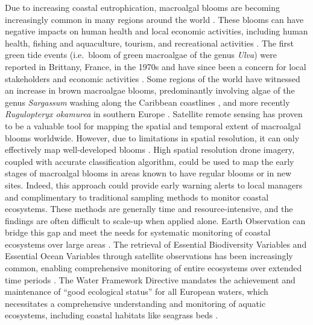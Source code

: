 \documentclass[
  number]{elsarticle}
\begin{document}
Due to increasing coastal eutrophication, macroalgal blooms are becoming
increasingly common in many regions around the world
\citep{sutton2011european, ye2011green}. These blooms can have negative
impacts on human health and local economic activities, including human
health, fishing and aquaculture, tourism, and recreational activities
\citep{villares1999nitrogen, ye2011green}. The first green tide events
(i.e.~bloom of green macroalgae of the genus \emph{Ulva}) were reported
in Brittany, France, in the 1970s and have since been a concern for
local stakeholders and economic activities \citep{menesguen2018marees}.
Some regions of the world have witnessed an increase in brown macroalgae
blooms, predominantly involving algae of the genus \emph{Sargassum}
washing along the Caribbean coastlines \citep{louime2017sargassum}, and
more recently \emph{Rugulopteryx okamurea} in southern Europe
\citep{Roca2022}. Satellite remote sensing has proven to be a valuable
tool for mapping the spatial and temporal extent of macroalgal blooms
worldwide. However, due to limitations in spatial resolution, it can
only effectively map well-developed blooms
\citep{rs13081408, klemas2012remote, haro2023biointertidal}. High
spatial resolution drone imagery, coupled with accurate classification
algorithm, could be used to map the early stages of macroalgal blooms in
areas known to have regular blooms or in new sites. Indeed, this
approach could provide early warning alerts to local managers and
complimentary to traditional sampling methods to monitor coastal
ecosystems. These methods are generally time and resource-intensive, and
the findings are often difficult to scale-up when applied alone. Earth
Observation can bridge this gap and meet the needs for systematic
monitoring of coastal ecosystems over large areas
\citep{papathanasopoulou2019satellite}. The retrieval of Essential
Biodiversity Variables and Essential Ocean Variables through satellite
observations has been increasingly common, enabling comprehensive
monitoring of entire ecosystems over extended time periods
\citep{ratnarajah2023monitoring, Zoffoli2021}. The Water Framework
Directive \citep{WFD2000} mandates the achievement and maintenance of
``good ecological status'' for all European waters, which necessitates a
comprehensive understanding and monitoring of aquatic ecosystems,
including coastal habitats like seagrass beds
\citep{foden2007angiosperms, nordlund2024one, Zoffoli2021}.
\end{document}
